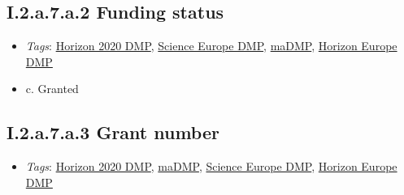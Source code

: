 \documentclass[a4paper,12pt]{report}
\begin{document}
\subsection*{\protect\textcolor{colorSecId}{I.2.a.7.a.2} Funding status}

\label{1e85da40-bbfc-4180-903e-6c569ed2da38.c3dabaaf-c946-4a0d-889c-ede966f97667.a14632ce-345c-48fa-8757-db609735ca1e.36a87eac-402d-43fb-a0df-ac5963bdf87d.c0562191-ba60-46e7-afc0-1cd6821f8568.54ff3b18-652f-4235-8f9f-3c87e2d63169}


\begin{itemize}
  \item \textit{Tags}: \ul{Horizon 2020 DMP}, \ul{Science Europe DMP}, \ul{maDMP}, \ul{Horizon Europe DMP}
  \end{itemize}




\begin{itemize}
  \item[\CheckmarkBold] c. Granted
\end{itemize}





\subsection*{\protect\textcolor{colorSecId}{I.2.a.7.a.3} Grant number}

\label{1e85da40-bbfc-4180-903e-6c569ed2da38.c3dabaaf-c946-4a0d-889c-ede966f97667.a14632ce-345c-48fa-8757-db609735ca1e.36a87eac-402d-43fb-a0df-ac5963bdf87d.c0562191-ba60-46e7-afc0-1cd6821f8568.1ccbd0bb-4263-4240-9dc5-936ef09eef53}


\begin{itemize}
  \item \textit{Tags}: \ul{Horizon 2020 DMP}, \ul{maDMP}, \ul{Science Europe DMP}, \ul{Horizon Europe DMP}
  \end{itemize}
\end{document}
